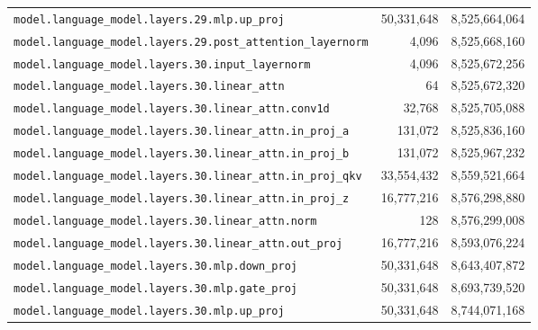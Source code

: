 \documentclass[10pt,a4paper]{article}
\theoremstyle{definition}
\begin{document}
\begin{appendices}
\begin{longtable}{p{9.5cm}rr}
\texttt{model.\allowbreak{}language\_model.\allowbreak{}layers.\allowbreak{}29.\allowbreak{}mlp.\allowbreak{}up\_proj} & 50,331,648 & 8,525,664,064 \\
\texttt{model.\allowbreak{}language\_model.\allowbreak{}layers.\allowbreak{}29.\allowbreak{}post\_attention\_layernorm} & 4,096 & 8,525,668,160 \\
\texttt{model.\allowbreak{}language\_model.\allowbreak{}layers.\allowbreak{}30.\allowbreak{}input\_layernorm} & 4,096 & 8,525,672,256 \\
\texttt{model.\allowbreak{}language\_model.\allowbreak{}layers.\allowbreak{}30.\allowbreak{}linear\_attn} & 64 & 8,525,672,320 \\
\texttt{model.\allowbreak{}language\_model.\allowbreak{}layers.\allowbreak{}30.\allowbreak{}linear\_attn.\allowbreak{}conv1d} & 32,768 & 8,525,705,088 \\
\texttt{model.\allowbreak{}language\_model.\allowbreak{}layers.\allowbreak{}30.\allowbreak{}linear\_attn.\allowbreak{}in\_proj\_a} & 131,072 & 8,525,836,160 \\
\texttt{model.\allowbreak{}language\_model.\allowbreak{}layers.\allowbreak{}30.\allowbreak{}linear\_attn.\allowbreak{}in\_proj\_b} & 131,072 & 8,525,967,232 \\
\texttt{model.\allowbreak{}language\_model.\allowbreak{}layers.\allowbreak{}30.\allowbreak{}linear\_attn.\allowbreak{}in\_proj\_qkv} & 33,554,432 & 8,559,521,664 \\
\texttt{model.\allowbreak{}language\_model.\allowbreak{}layers.\allowbreak{}30.\allowbreak{}linear\_attn.\allowbreak{}in\_proj\_z} & 16,777,216 & 8,576,298,880 \\
\texttt{model.\allowbreak{}language\_model.\allowbreak{}layers.\allowbreak{}30.\allowbreak{}linear\_attn.\allowbreak{}norm} & 128 & 8,576,299,008 \\
\texttt{model.\allowbreak{}language\_model.\allowbreak{}layers.\allowbreak{}30.\allowbreak{}linear\_attn.\allowbreak{}out\_proj} & 16,777,216 & 8,593,076,224 \\
\texttt{model.\allowbreak{}language\_model.\allowbreak{}layers.\allowbreak{}30.\allowbreak{}mlp.\allowbreak{}down\_proj} & 50,331,648 & 8,643,407,872 \\
\texttt{model.\allowbreak{}language\_model.\allowbreak{}layers.\allowbreak{}30.\allowbreak{}mlp.\allowbreak{}gate\_proj} & 50,331,648 & 8,693,739,520 \\
\texttt{model.\allowbreak{}language\_model.\allowbreak{}layers.\allowbreak{}30.\allowbreak{}mlp.\allowbreak{}up\_proj} & 50,331,648 & 8,744,071,168 \\

\end{longtable}
\end{appendices}
\end{document}
